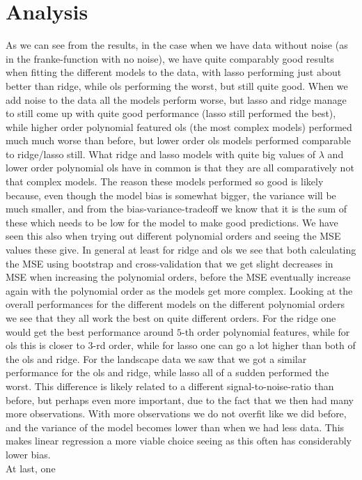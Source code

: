 \documentclass{article}
\begin{document}
\section{Analysis}
As we can see from the results, in the case when we have data without noise
(as in the franke-function with no noise), we have quite comparably good results
when fitting the different models to the data, with lasso performing just about
better than ridge, while ols performing the worst, but still quite good. When we
add noise to the data all the models perform worse, but lasso and ridge manage
to still come up with quite good performance (lasso still performed the best),
while higher order polynomial featured ols (the most complex models) performed
much much worse than before, but lower order ols models performed comparable to
ridge/lasso still.  What ridge and lasso models with quite big values of
$\lambda$ and lower order polynomial ols have in common is that they are all
comparatively not that complex models. The reason these models performed so good
is likely because, even though the model bias is somewhat bigger, the variance
will be much smaller, and from the bias-variance-tradeoff we know that it is the
sum of these which needs to be low for the model to make good predictions. We
have seen this also when trying out different polynomial orders and seeing the
MSE values these give. In general at least for ridge and ols we see that both
calculating the MSE using bootstrap and cross-validation that we get slight
decreases in MSE when increasing the polynomial orders, before the MSE
eventually increase again with the polynomial order as the models get more
complex. Looking at the overall performances for the different models on the
different polynomial orders we see that they all work the best on quite
different orders. For the ridge one would get the best performance around $5$-th
order polynomial features, while for ols this is closer to $3$-rd order, while
for lasso one can go a lot higher than both of the ols and ridge.  For the
landscape data we saw that we got a similar performance for the ols and ridge,
while lasso all of a sudden performed the worst. This difference is likely
related to a different signal-to-noise-ratio than before, but perhaps even more
important, due to the fact that we then had many more observations. With more
observations we do not overfit like we did before, and the variance of the model
becomes lower than when we had less data.  This makes linear regression a more
viable choice seeing as this often has considerably lower bias.\\ At last, one
\end{document}
